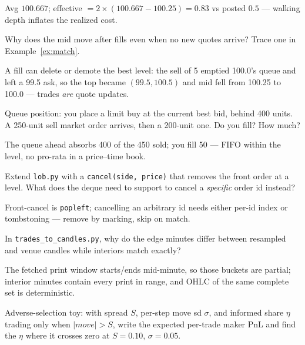 \begin{solution}
Avg $100.667$; effective $=2\times(100.667-100.25)=0.83$ vs posted
$0.5$ --- walking depth inflates the realized cost.
\end{solution}
\begin{exercise}[medium]
Why does the mid move after fills even when no new quotes arrive?
Trace one in Example~\ref{ex:match}.
\end{exercise}
\begin{solution}
A fill can delete or demote the best level: the sell of 5 emptied
100.0's queue and left a 99.5 ask, so the top became
$(99.5,100.5)$ and mid fell from 100.25 to 100.0 --- trades
\emph{are} quote updates.
\end{solution}
\begin{exercise}[medium]
Queue position: you place a limit buy at the current best bid,
behind 400 units. A 250-unit sell market order arrives, then a
200-unit one. Do you fill? How much?
\end{exercise}
\begin{solution}
The queue ahead absorbs 400 of the 450 sold; you fill 50 --- FIFO
within the level, no pro-rata in a price--time book.
\end{solution}
\begin{exercise}[medium]
Extend \texttt{lob.py} with a \texttt{cancel(side, price)} that
removes the front order at a level. What does the deque need to
support to cancel a \emph{specific} order id instead?
\end{exercise}
\begin{solution}
Front-cancel is \texttt{popleft}; cancelling an arbitrary id needs
either per-id index or tombstoning --- remove by marking, skip on
match.
\end{solution}
\begin{exercise}[medium]
In \texttt{trades\_to\_candles.py}, why do the edge minutes differ
between resampled and venue candles while interiors match exactly?
\end{exercise}
\begin{solution}
The fetched print window starts/ends mid-minute, so those buckets
are partial; interior minutes contain every print in range, and OHLC
of the same complete set is deterministic.
\end{solution}
\begin{exercise}[hard]
Adverse-selection toy: with spread $S$, per-step move sd $\sigma$,
and informed share $\eta$ trading only when $|move|>S$, write the
expected per-trade maker PnL and find the $\eta$ where it crosses
zero at $S=0.10$, $\sigma=0.05$.
\end{exercise}
